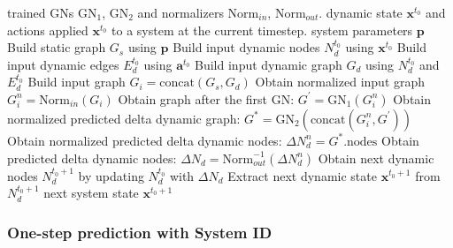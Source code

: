 \begin{algorithm}[tb]
   \caption{Forward prediction algorithm.}
   \label{sm:alg:forward_algorithm}
\begin{algorithmic}
     trained GNs $\textrm{GN}_1$, $\textrm{GN}_2$ and normalizers $\textrm{Norm}_{in}$, $\textrm{Norm}_{out}$.
    dynamic state $\textbf{x}^{t_0}$ and actions applied $\textbf{x}^{t_0}$ to a system at the current timestep.
    system parameters  $\textbf{p}$
   \STATE Build static graph $G_s$ using $\textbf{p}$
   \STATE Build input dynamic nodes $N^{t_0}_d$ using $\textbf{x}^{t_0}$
   \STATE Build input dynamic edges $E^{t_0}_d$ using $\textbf{a}^{t_0}$
   \STATE Build input dynamic graph $G_d$ using $N^{t_0}_d$ and $E^{t_0}_d$
   \STATE Build input graph $G_i = \textrm{concat}(G_s, G_d)$
   \STATE Obtain normalized input graph $G^n_i = \textrm{Norm}_{in}(G_i)$
   \STATE Obtain graph after the first GN:
   $G^{'}= \textrm{GN}_1(G^n_i)$ 
   \STATE Obtain normalized predicted delta dynamic graph:
   $G^{*}= \textrm{GN}_2(\textrm{concat}(G^n_i, G^{'}))$ 
   \STATE Obtain normalized predicted delta dynamic nodes:
   ${\Delta}N^{n}_d= G^{*}\textrm{.nodes}$  
   \STATE Obtain predicted delta dynamic nodes:
   ${\Delta}N_d = \textrm{Norm}^{-1}_{out}({\Delta}N^{n}_d)$
   \STATE Obtain next dynamic nodes $N^{t_0+1}_d$ by updating $N^{t_0}_d$ with ${\Delta}N_d$
   \STATE Extract next dynamic state $\textbf{x}^{t_0+1}$ from $N^{t_0+1}_d$
    next system state $\textbf{x}^{t_0+1}$
\end{algorithmic}
\end{algorithm}


\subsubsection{One-step prediction with System ID}
\label{sm:alg:one_step_prediction_sysid}

